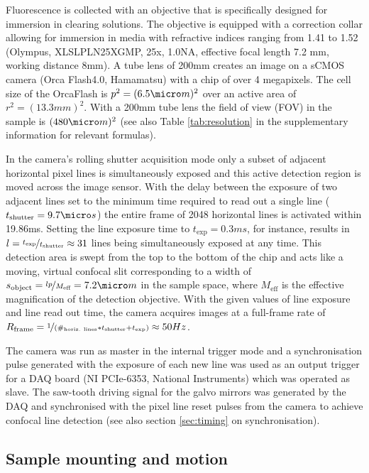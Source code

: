 \documentclass[12pt]{spieman}  %
\begin{document}
\begin{spacing}{2}
Fluorescence is collected with an objective that is specifically designed for immersion in clearing solutions. The objective is equipped with a correction collar allowing for immersion in media with refractive indices ranging from 1.41 to 1.52 (Olympus, XLSLPLN25XGMP, 25x, 1.0NA, effective focal length 7.2 mm, working distance 8mm). A tube lens of 200mm creates an image on a sCMOS camera (Orca Flash4.0, Hamamatsu) with a chip of over 4 megapixels. The cell size of the OrcaFlash is $p^2= (6.5\micro m)^2$ over an active area of $r^2= (13.3mm)^2$. With a 200mm tube lens the field of view (FOV) in the sample is $(480\micro m)^2$ (see also Table \ref{tab:resolution} in the supplementary information for relevant formulas). 

In the camera's rolling shutter acquisition mode only a subset of adjacent horizontal pixel lines is simultaneously exposed and this active detection region is moved across the image sensor\cite{Baumgart2012}. With the delay between the exposure of two adjacent lines set to the minimum time required to read out a single line ($t_{\text{shutter}}=9.7\micro s$) the entire frame of 2048 horizontal lines is activated within 19.86ms. Setting the line exposure time to $t_{\text{exp}}=0.3ms$, for instance, results in $l=\nicefrac{t_{\text{exp}}}{t_{\text{shutter}}}\approx31$  lines being simultaneously exposed at any time. This detection area is swept from the top to the bottom of the chip and acts like a moving, virtual confocal slit corresponding to a width of $s_{\text{object}}=\nicefrac{l p}{M_{\text{eff}}}= 7.2 \micro m $ in the sample space, where $M_{\text{eff}}$ is the effective magnification of the detection objective. With the given values of line exposure and line read out time, the camera acquires images at a full-frame rate of  $R_{\text{frame}} = \nicefrac{1}{(\#_{\text{horiz. lines}}*t_{\text{shutter}}+t_{\text{exp}})} \approx 50Hz$. 

The camera was run as master in the internal trigger mode and a synchronisation pulse generated with the exposure of each new line was used as an output trigger for a DAQ board (NI PCIe-6353, National Instruments) which was operated as slave. The saw-tooth driving signal for the galvo mirrors was generated by the DAQ and synchronised with the pixel line reset pulses from the camera to achieve confocal line detection (see also section \ref{sec:timing} on synchronisation).  

\subsection{Sample mounting and motion}
\label{sec:mounting}
		

\end{spacing}
\end{document}
